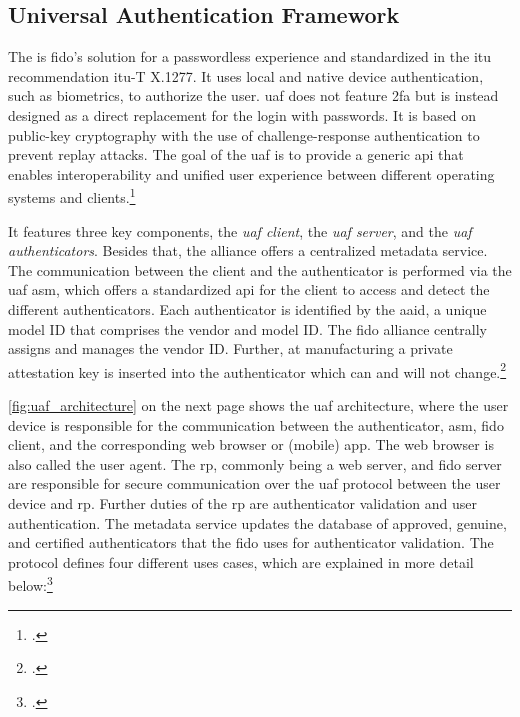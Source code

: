 \subsection{Universal Authentication Framework}

The  is \gls{fido}'s solution for a passwordless experience and standardized in the \gls{itu} recommendation \gls{itu}-T X.1277. It uses local and native device authentication, such as biometrics, to authorize the user. \gls{uaf} does not feature \gls{2fa} but is instead designed as a direct replacement for the login with passwords. It is based on public-key cryptography with the use of challenge-response authentication to prevent replay attacks. The goal of the \gls{uaf} is to provide a generic \gls{api} that enables interoperability and unified user experience between different operating systems and clients.\footcites[See][249]{Schwartz2018}[See][197--198]{dasgupta2017multi}[See][]{itu-uaf}

It features three key components, the \textit{\gls{uaf} client}, the \textit{\gls{uaf} server}, and the \textit{\gls{uaf} authenticators}. Besides that, the alliance offers a centralized metadata service. The communication between the client and the authenticator is performed via the \gls{uaf} \gls{asm}, which offers a standardized \gls{api} for the client to access and detect the different authenticators. Each authenticator is identified by the \gls{aaid}, a unique model ID that comprises the vendor and model ID. The \gls{fido} alliance centrally assigns and manages the vendor ID. Further, at manufacturing a private attestation key is inserted into the authenticator which can and will not change.\footcites[See][145]{10.1007/978-3-319-26502-5_10}[See][8]{uaf-protocol}

\autoref{fig:uaf_architecture} on the next page shows the \gls{uaf} architecture, where the user device is responsible for the communication between the authenticator, \gls{asm}, \gls{fido} client, and the corresponding web browser or (mobile) app. The web browser is also called the user agent. The \gls{rp}, commonly being a web server, and \gls{fido} server are responsible for secure communication over the \gls{uaf} protocol between the user device and \gls{rp}. Further duties of the \gls{rp} are authenticator validation and user authentication. The metadata service updates the database of approved, genuine, and certified authenticators that the \gls{fido} uses for authenticator validation. The protocol defines four different uses cases, which are explained in more detail below:\footcites[See][4]{uaf-protocol}

